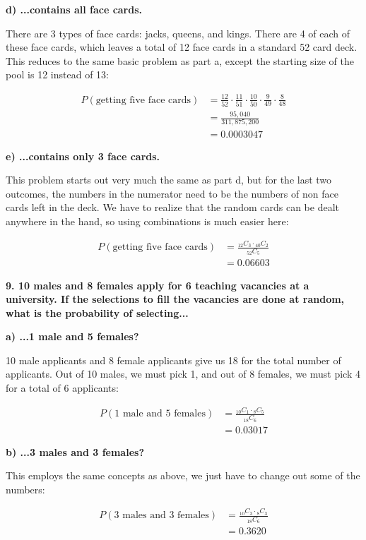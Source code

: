 \documentclass[12pt, letterpaper]{article}
\begin{document}
\qquad \textbf{d) ...contains all face cards.}
\begin{center}
	There are 3 types of face cards: jacks, queens, and kings. There are 4 of each of these face cards, which leaves a total of 12 face cards in a standard 52 card deck. This reduces to the same basic problem as part a, except the starting  size of the pool is 12 instead of 13:
\end{center}
\begin{align*}
	P(\text{getting five face cards}) &= \frac{12}{52} \cdot \frac{11}{51} \cdot \frac{10}{50} \cdot \frac{9}{49} \cdot \frac{8}{48} \\
	&= \frac{95,040}{311,875,200} \\
	&= \boxed{0.0003047}
\end{align*}

\qquad \textbf{e) ...contains only 3 face cards.}
\begin{center}
	This problem starts out very much the same as part d, but for the last two outcomes, the numbers in the numerator need to be the numbers of non face cards left in the deck. We have to realize that the random cards can be dealt anywhere in the hand, so using combinations is much easier here:
\end{center}
\begin{align*}
	P(\text{getting five face cards}) &= \frac{{}_{12}C_{3} \cdot {}_{40}C_{2}}{{}_{52}C_{5}} \\
	&= \boxed{0.06603}
\end{align*}

\pagebreak

\textbf{9. 10 males and 8 females apply for 6 teaching vacancies at a university. If the selections to fill the vacancies are done at random, what is the probability of selecting...}

\qquad \textbf{a) ...1 male and 5 females?}
\begin{center}
	10 male applicants and 8 female applicants give us 18 for the total number of applicants. Out of 10 males, we must pick 1, and out of 8 females, we must pick 4 for a total of 6 applicants:
\end{center}
\begin{align*}
	P(\text{1 male and 5 females}) &= \frac{{}_{10}C_{1} \cdot {}_{8}C_{5}}{{}_{18}C_{6}} \\
	&= \boxed{0.03017}
\end{align*}

\qquad \textbf{b) ...3 males and 3 females?}
\begin{center}
	This employs the same concepts as above, we just have to change out some of the numbers:
\end{center}
\begin{align*}
	P(\text{3 males and 3 females}) &= \frac{{}_{10}C_{3} \cdot {}_{8}C_{3}}{{}_{18}C_{6}} \\
	&= \boxed{0.3620}
\end{align*}
\end{document}
